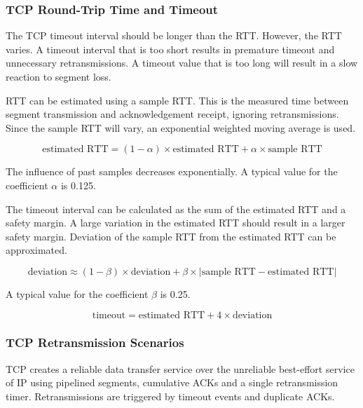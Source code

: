 \subsubsection{TCP Round-Trip Time and Timeout}

The TCP timeout interval should be longer than the RTT\@.
However, the RTT varies.
A timeout interval that is too short results in premature timeout and unnecessary retransmissions.
A timeout value that is too long will result in a slow reaction to segment loss.

RTT can be estimated using a sample RTT\@.
This is the measured time between segment transmission and acknowledgement receipt, ignoring retransmissions.
Since the sample RTT will vary, an exponential weighted moving average is used.

\begin{equation*}
  \text{estimated RTT} = \left( 1 - \alpha \right) \times \text{estimated RTT} + \alpha \times \text{sample RTT}
\end{equation*}

The influence of past samples decreases exponentially.
A typical value for the coefficient \(\alpha\) is \num{0.125}.

The timeout interval can be calculated as the sum of the estimated RTT and a safety margin.
A large variation in the estimated RTT should result in a larger safety margin.
Deviation of the sample RTT from the estimated RTT can be approximated.

\begin{equation*}
  \text{deviation} \approx (1 - \beta) \times \text{deviation} + \beta \times \left| \text{sample RTT} - \text{estimated RTT} \right|
\end{equation*}

A typical value for the coefficient \(\beta\) is \num{0.25}.

\begin{equation*}
  \text{timeout} = \text{estimated RTT} + 4 \times \text{deviation}
\end{equation*}

\subsubsection{TCP Retransmission Scenarios}

TCP creates a reliable data transfer service over the unreliable best-effort service of IP using pipelined segments, cumulative ACKs and a single retransmission timer.
Retransmissions are triggered by timeout events and duplicate ACKs.

